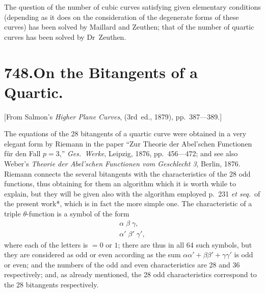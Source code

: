 \documentclass[12pt,a4paper]{article}
\begin{document}
The question of the number of cubic curves satisfying given elementary conditions (depending as it does on the consideration of the degenerate forms of these curves) has been solved by Maillard and Zeuthen; that of the number of quartic curves has been solved by Dr~Zeuthen.


\newpage
\section*{\textbf{748.}\quad On the Bitangents of a Quartic.}

[From Salmon's \textit{Higher Plane Curves}, (3rd~ed., 1879), pp.~387---389.]

\medskip

The equations of the 28 bitangents of a quartic curve were obtained in a very elegant form by Riemann in the paper ``Zur Theorie der Abel'schen Functionen f\"ur den Fall $p = 3$,'' \textit{Ges.\ Werke}, Leipzig, 1876, pp.~456---472; and see also Weber's \textit{Theorie der Abel'schen Functionen vom Geschlecht 3}, Berlin, 1876. Riemann connects the several bitangents with the characteristics of the 28 odd functions, thus obtaining for them an algorithm which it is worth while to explain, but they will be given also with the algorithm employed p.~231 \textit{et seq.}\ of the present work*, which is in fact the more simple one. The characteristic of a triple $\theta$-function is a symbol of the form
\[
\begin{array}{c}
\alpha\;\beta\;\gamma, \\[-4pt]
\alpha'\;\beta'\;\gamma',
\end{array}
\]
where each of the letters is $= 0$ or $1$; there are thus in all 64 such symbols, but they are considered as odd or even according as the sum $\alpha\alpha' + \beta\beta' + \gamma\gamma'$ is odd or even; and the numbers of the odd and even characteristics are 28 and 36 respectively; and, as already mentioned, the 28 odd characteristics correspond to the 28 bitangents respectively.

\end{document}
